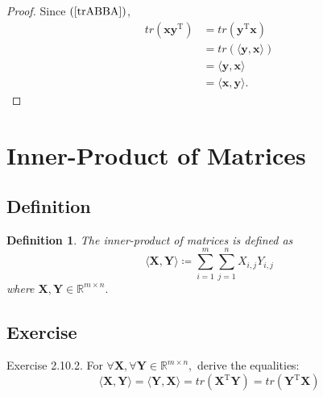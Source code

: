\documentclass{article}
\theoremstyle{plain}
\newtheorem{dfn}{Definition}[subsection]
\begin{document}
\begin{proof}
	Since $(\ref{trABBA})$,
	\begin{equation*}
		\begin{split}
			tr(\bm{x} \bm{y}^\mathrm{T}) &= tr(\bm{y}^\mathrm{T} \bm{x}) \\
			&= tr(\langle \bm{y} , \bm{x} \rangle) \\
			&= \langle \bm{y} , \bm{x} \rangle \\
			&= \langle \bm{x} , \bm{y} \rangle .
		\end{split}
	\end{equation*}
\end{proof}


\section{Inner-Product of Matrices}

\subsection{Definition}

\begin{dfn}
	The inner-product of matrices is defined as
	\begin{equation}
		\label{inner-product_of_matrices}
		\langle \bm{X} , \bm{Y} \rangle \coloneq \sum_{i=1}^m \sum_{j=1}^n X_{i,j} Y_{i,j}
	\end{equation}
	where
	\begin{math}
		\bm{X} , \bm{Y} \in \mathbb{R}^{m \times n} .
	\end{math}
	
\end{dfn}


\subsection{Exercise}

\begin{itembox}[l]{Exercise 2.10.2.}
	For
	\begin{math}
		\forall \bm{X} , \forall \bm{Y} \in \mathbb{R}^{m \times n} ,
	\end{math}
	derive the equalities:
	\begin{equation}
		\label{ex2102}
		\langle \bm{X} , \bm{Y} \rangle = \langle \bm{Y} , \bm{X} \rangle
		= tr(\bm{X}^\mathrm{T} \bm{Y}) = tr(\bm{Y}^\mathrm{T} \bm{X})
	\end{equation}
\end{itembox}
\end{document}
